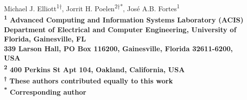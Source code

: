 \begin{flushleft}

{\Large
 \textbf{}
 }
 \newline
Michael J. Elliott\textsuperscript{1}\textsuperscript{†},
Jorrit H. Poelen\textsuperscript{2}\textsuperscript{†}\textsuperscript{*},
José A.B. Fortes\textsuperscript{1}
\bigskip
\\
\bf{\textsuperscript{1}} Advanced Computing and Information Systems Laboratory (ACIS)\\Department of Electrical and Computer Engineering, University of Florida, Gainesville, FL\\339 Larson Hall, PO Box 116200, Gainesville, Florida 32611-6200, USA
\\
\bf{\textsuperscript{2}} 400 Perkins St Apt 104, Oakland, California, USA
\\
\bf{\textsuperscript{†}} These authors contributed equally to this work
\\
\bf{\textsuperscript{*}} Corresponding author
\bigskip


\end{flushleft}

